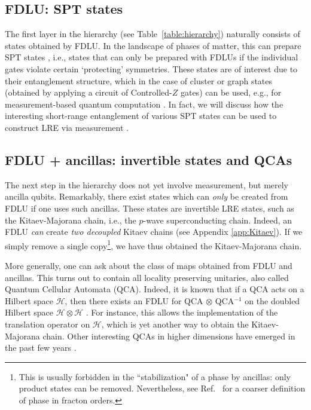 \documentclass[nofootinbib,prx,twocolumn,showpacs,superscriptaddress,notitlepage,amsmath,amssymb]{revtex4-2}
\theoremstyle{definition}
\begin{document}
\subsection{FDLU: SPT states}
The first layer in the hierarchy (see Table~\ref{table:hierarchy}) naturally consists of states obtained by FDLU. In the landscape of phases of matter, this can prepare SPT states \cite{Gu09,Pollmann10,Fidkowski_2011,Turner11,Schuch11,ChenGuWen11A,ChenGuWen11B,Chen_2011,Chen_2013,pollmann_symmetry_2012,LuVishwanath12,SenthilLevin13,Levin_2012,VishwanathSenthil2013,Else_2014}, i.e., states that can only be prepared with FDLUs if the individual gates violate certain `protecting' symmetries. These states are of interest due to their entanglement structure, which in the case of cluster or graph states (obtained by applying a circuit of Controlled-$Z$ gates) can be used, e.g., for measurement-based quantum computation \cite{GottesmanChuang1999,BriegelRaussendorf2001,RaussendorfBriegel2001,RaussendorfBrowneBriegel2003}. In fact, we will discuss how the interesting short-range entanglement of various SPT states can be used to construct LRE via measurement \cite{measureSPT}.

\subsection{FDLU + ancillas: invertible states and QCAs} The next step in the hierarchy does not yet involve measurement, but merely ancilla qubits. Remarkably, there exist states which can \emph{only} be created from FDLU if one uses such ancillas. These states are invertible LRE states, such as the Kitaev-Majorana chain, i.e., the $p$-wave superconducting chain. Indeed, an FDLU \emph{can} create \emph{two decoupled} Kitaev chains (see Appendix \ref{app:Kitaev}). If we simply remove a single copy\footnote{This is usually forbidden in the ``stabilization" of a phase by ancillas: only product states can be removed. Nevertheless, see Ref.~ for a coarser definition of phase in fracton orders.}, we have thus obtained the Kitaev-Majorana chain.

More generally, one can ask about the class of maps obtained from FDLU and ancillas. This turns out to contain all locality preserving unitaries, also called Quantum Cellular Automata (QCA). Indeed, it is known that if a QCA acts on a Hilbert space $\mathcal H$, then there exists an FDLU for QCA $\otimes$ QCA$^{-1}$ on the doubled Hilbert space $\mathcal H \otimes \mathcal H$ \cite{HaahFidkowskiHastings18}. For instance, this allows the implementation of the translation operator on $\mathcal H$, which is yet another way to obtain the Kitaev-Majorana chain. Other interesting QCAs in higher dimensions have emerged in the past few years \cite{HaahFidkowskiHastings18,Haah21,Shirley22,Haah22}.
\end{document}
